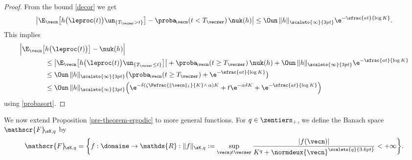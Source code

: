 \begin{proof}
From the bound \eqref{decor} we get
\[
\left|\E_{\vecn}\bigl[h\bigl(\leproc(t)\bigr)\un_{\{T_{\veczer}>t\}}\bigr]
-\proba\!_{\vecn}(t<T_{\veczer})\,\nuk(h)\right|
\le\Oun\, \|h\|_{\scaleto{\infty}{3pt}}\e^{-\sfrac{a t}{\log K}}.
\]
This implies
\begin{align*}
\Bigl|\E_{\vecn}\bigl[&h\bigl(\leproc(t)\bigr)\bigr]-\nuk(h)\Bigr| \\
& \le
\left|\E_{\vecn} \bigl[h\bigl(\leproc(t)\bigr)\un_{\{T_{\veczer}\le t\}} \bigr]\right|
+\proba\!_{\vecn}(t\ge T_{\veczer})\,\nuk(h)+\Oun\, \|h\|_{\scaleto{\infty}{3pt}}\e^{-\sfrac{a t}{\log K}}
\\
& \le \Oun\, \|h\|_{\scaleto{\infty}{3pt}}\bigl(\proba\!_{\vecn}(t\ge T_{\veczer})+\e^{-\sfrac{a t}{\log K}}\bigr)
\\
& \le \Oun\, \|h\|_{\scaleto{\infty}{3pt}}\Bigl(\e^{-\delta\left(\zeta\Psfrac{\|\vecn\|_{1}}{K}\wedge\,\alpha\right)K}
+t \e^{-\alpha\delta K}+\e^{-\sfrac{a t}{\log K}}\Bigr)
\end{align*}
using \eqref{probasort}.
\end{proof}

We now extend Proposition \ref{pre-theorem-ergodic} to more general functions.
For $q\in\zentiers_+$, we define the Banach space
$\mathscr{F}\!_{\sK,q}$ by
\begin{equation}\label{observables}
\mathscr{F}\!_{\sK,q}
=\biggl\{f: \domaine \rightarrow \mathds{R} :
\|f\|_{\sK,q}:= \sup_{ \vecn\neq \veczer} \frac{|f(\vecn)|}{K^q+\normdeux{\vecn}^{\scaleto{q}{3.6pt}}}<+\infty \biggr\}.
\end{equation}

